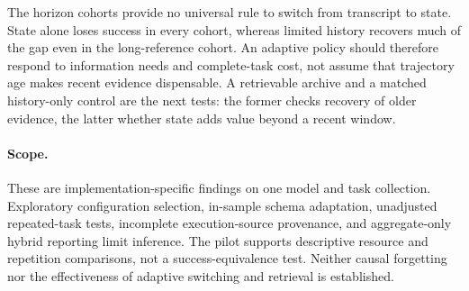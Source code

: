 The horizon cohorts provide no universal rule to switch from transcript
to state. State alone loses success in every cohort, whereas limited
history recovers much of the gap even in the long-reference cohort.
An adaptive policy should therefore respond to information needs and
complete-task cost, not assume that trajectory age makes recent evidence
dispensable. A retrievable archive and a matched history-only control are
the next tests: the former checks recovery of older evidence, the latter
whether state adds value beyond a recent window.

\paragraph{Scope.}
These are implementation-specific findings on one model and task
collection. Exploratory configuration selection, in-sample schema
adaptation, unadjusted repeated-task tests, incomplete execution-source
provenance, and aggregate-only hybrid reporting limit inference.
The pilot supports descriptive resource and repetition comparisons, not a
success-equivalence test. Neither causal forgetting nor the effectiveness
of adaptive switching and retrieval is established.

